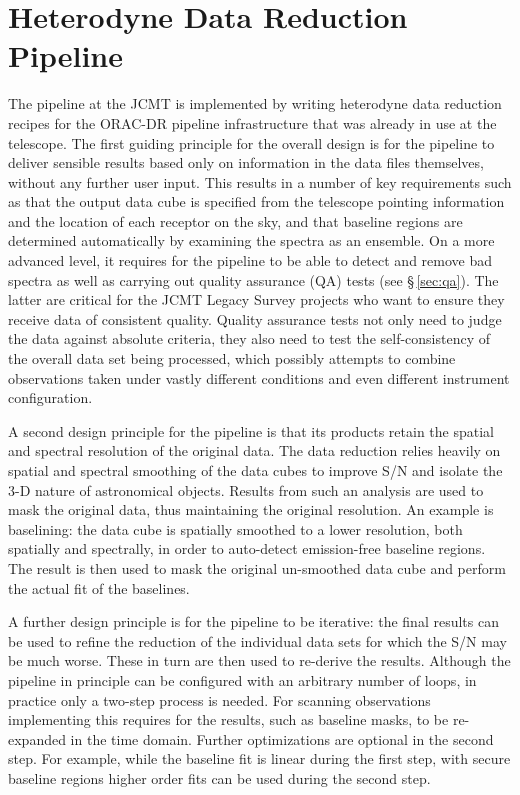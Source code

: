 \documentclass[final,authoryear,5p,times,twocolumn]{elsarticle}
\begin{document}
\section{Heterodyne Data Reduction Pipeline}

The pipeline at the JCMT is implemented by writing heterodyne data
reduction recipes for the ORAC-DR pipeline infrastructure
\citep{2011tfa..confE..42J,2008AN....329..295C} that was already in
use at the telescope. The first guiding principle for the overall
design is for the pipeline to deliver sensible results based only on
information in the data files themselves, without any further user
input. This results in a number of key requirements such as that the
output data cube is specified from the telescope pointing information
and the location of each receptor on the sky, and that baseline
regions are determined automatically by examining the spectra as an
ensemble. On a more advanced level, it requires for the pipeline to be
able to detect and remove bad spectra as well as carrying out quality
assurance (QA) tests (see \S\,\ref{sec:qa}). The latter are critical
for the JCMT Legacy Survey projects
\citep{2007PASP..119..855W,2009ApJ...693.1736W,2007PASP..119..102P}
who want to ensure they receive data of consistent quality.  Quality
assurance tests not only need to judge the data against absolute
criteria, they also need to test the self-consistency of the overall
data set being processed, which possibly attempts to combine
observations taken under vastly different conditions and even
different instrument configuration.

A second design principle for the pipeline is that its products
retain the spatial and spectral resolution of the original data.  The
data reduction relies heavily on spatial and spectral smoothing of the
data cubes to improve S/N and isolate the 3-D nature of astronomical
objects. Results from such an analysis are used to mask the original
data, thus maintaining the original resolution. An example is
baselining: the data cube is spatially smoothed to a lower resolution,
both spatially and spectrally, in order to auto-detect emission-free
baseline regions. The result is then used to mask the original
un-smoothed data cube and perform the actual fit of the baselines.

A further design principle is for the pipeline to be iterative: the
final results can be used to refine the reduction of the individual data
sets for which the S/N may be much worse. These in turn are then used
to re-derive the results. Although the pipeline in principle can be
configured with an arbitrary number of loops, in practice only a
two-step process is needed. For scanning observations implementing
this requires for the results, such as baseline masks, to be
re-expanded in the time domain. Further optimizations are optional in
the second step. For example, while the baseline fit is linear
during the first step, with secure baseline regions higher order fits
can be used during the second step.
\end{document}
